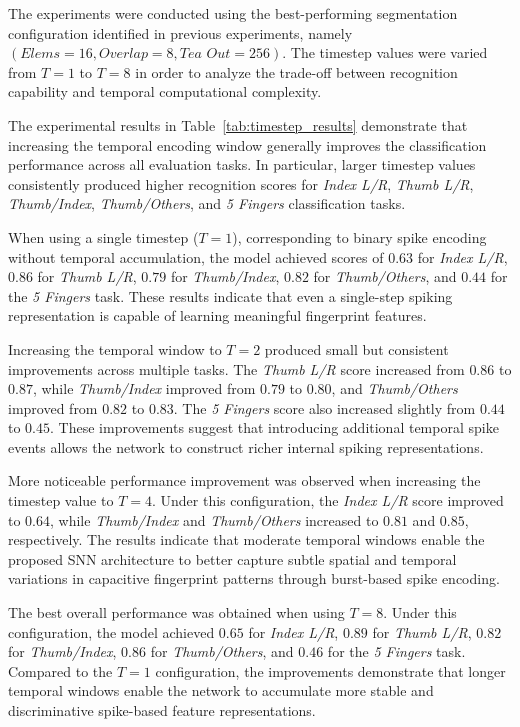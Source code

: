 \documentclass[../main.tex]{subfiles}
\begin{document}
The experiments were conducted using the best-performing segmentation configuration identified in previous experiments, namely \((\textit{Elems}=16, \textit{Overlap}=8, \textit{Tea Out}=256)\). The timestep values were varied from \(T=1\) to \(T=8\) in order to analyze the trade-off between recognition capability and temporal computational complexity.

The experimental results in Table~\ref{tab:timestep_results} demonstrate that increasing the temporal encoding window generally improves the classification performance across all evaluation tasks. In particular, larger timestep values consistently produced higher recognition scores for \textit{Index L/R}, \textit{Thumb L/R}, \textit{Thumb/Index}, \textit{Thumb/Others}, and \textit{5 Fingers} classification tasks.

When using a single timestep (\(T=1\)), corresponding to binary spike encoding without temporal accumulation, the model achieved scores of \(0.63\) for \textit{Index L/R}, \(0.86\) for \textit{Thumb L/R}, \(0.79\) for \textit{Thumb/Index}, \(0.82\) for \textit{Thumb/Others}, and \(0.44\) for the \textit{5 Fingers} task. These results indicate that even a single-step spiking representation is capable of learning meaningful fingerprint features.

Increasing the temporal window to \(T=2\) produced small but consistent improvements across multiple tasks. The \textit{Thumb L/R} score increased from \(0.86\) to \(0.87\), while \textit{Thumb/Index} improved from \(0.79\) to \(0.80\), and \textit{Thumb/Others} improved from \(0.82\) to \(0.83\). The \textit{5 Fingers} score also increased slightly from \(0.44\) to \(0.45\). These improvements suggest that introducing additional temporal spike events allows the network to construct richer internal spiking representations.

More noticeable performance improvement was observed when increasing the timestep value to \(T=4\). Under this configuration, the \textit{Index L/R} score improved to \(0.64\), while \textit{Thumb/Index} and \textit{Thumb/Others} increased to \(0.81\) and \(0.85\), respectively. The results indicate that moderate temporal windows enable the proposed SNN architecture to better capture subtle spatial and temporal variations in capacitive fingerprint patterns through burst-based spike encoding.

The best overall performance was obtained when using \(T=8\). Under this configuration, the model achieved \(0.65\) for \textit{Index L/R}, \(0.89\) for \textit{Thumb L/R}, \(0.82\) for \textit{Thumb/Index}, \(0.86\) for \textit{Thumb/Others}, and \(0.46\) for the \textit{5 Fingers} task. Compared to the \(T=1\) configuration, the improvements demonstrate that longer temporal windows enable the network to accumulate more stable and discriminative spike-based feature representations.
\end{document}
